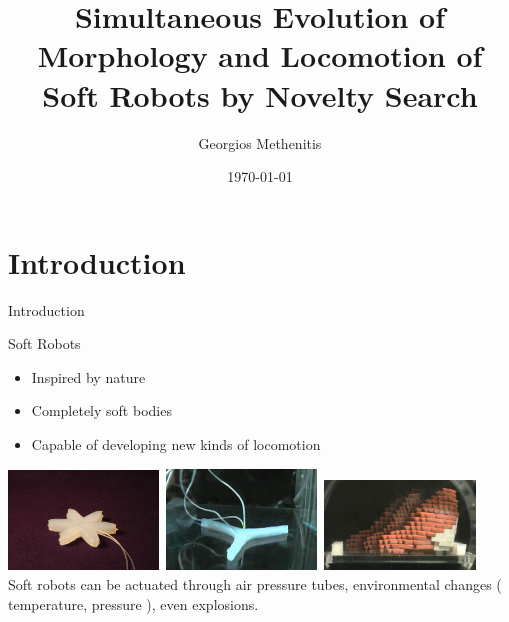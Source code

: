 \documentclass{beamer}
\title[Simultaneous Evolution of Morphology and Locomotion of Soft Robots by Novelty Search]{Simultaneous Evolution of Morphology and Locomotion of Soft Robots by Novelty Search}
\author{Georgios Methenitis}
\institute{University of Amsterdam}
\date{\today}
\begin{document}
\begin{frame}
  \titlepage
\end{frame}


\section{Introduction}
\begin{frame}{Introduction}
\begin{block}{Soft Robots}
\begin{itemize}
\item Inspired by nature
\item Completely soft bodies
\item Capable of developing new kinds of locomotion
\end{itemize}
\end{block}
\includegraphics[width=0.3\textwidth,height=0.25\textheight]{figures/soft_robotics_figure.png}\	
\includegraphics[width=0.3\textwidth,height=0.25\textheight]{figures/ExplodingRobot.jpg}\	
\includegraphics[width=0.3\textwidth,height=0.25\textheight]{figures/hillerPressureChamber.png}\\
\vspace{0.3cm}
Soft robots can be actuated through air pressure tubes, environmental changes ( temperature, pressure ), even explosions.
\end{frame}
\end{document}
